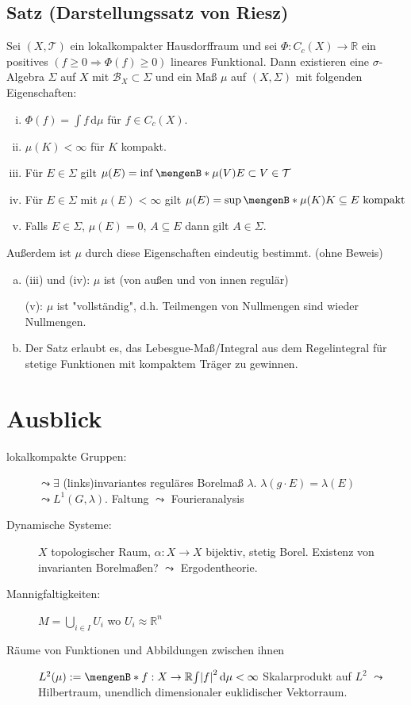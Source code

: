 \subsection{Satz (Darstellungssatz von Riesz)} %
\label{sub:925}
Sei $(X,\mathcal{T})$ ein lokalkompakter Hausdorffraum und sei $\Phi : C_c(X) \to \mathds{R}$ ein positives $(f \ge 0 \Rightarrow \Phi(f)\ge 0)$ lineares Funktional.
Dann existieren eine $\sigma$-Algebra $\Sigma$ auf $X$ mit $\mathcal{B}_X \subset \Sigma$ und ein Maß $\mu$ auf $(X, \Sigma)$ mit folgenden Eigenschaften:
\begin{enumerate}[(i)]
	\item $\Phi(f) = \int\! f  \, \mathrm{d}\mu$ für $f \in C_c(X)$.
	\item $\mu(K)< \infty$ für $K$ kompakt. 
	\item Für $E \in \Sigma$ gilt $\mu(E)= \inf\set[\mu(V)]{E \subset V \in \mathcal{T} } $
	\item Für $E \in \Sigma$ mit $\mu(E)< \infty$ gilt $\mu(E) = \sup \set[\mu(K)]{K \subseteq E \text{ kompakt}} $
	\item Falls $E \in \Sigma$, $\mu(E)=0$, $A \subseteq E$ dann gilt $A \in \Sigma$.
\end{enumerate} 
Außerdem ist $\mu$ durch diese Eigenschaften eindeutig bestimmt. \bewende(ohne Beweis)
\begin{enumerate}[a)]
	\item (iii) und (iv): $\mu$ ist  (von außen und von innen regulär) 
	
	(v): $\mu$ ist "{}vollständig"{}, d.h. Teilmengen von Nullmengen sind wieder Nullmengen.
	\item Der Satz erlaubt es, das Lebesgue-Maß/Integral aus dem Regelintegral für stetige Funktionen mit kompaktem Träger zu gewinnen.
\end{enumerate}
\newpage

\section{Ausblick} %
\label{sec:10}
\begin{description}
	\item[lokalkompakte Gruppen:] $\leadsto \exists$ (links)invariantes reguläres Borelmaß $\lambda$. $\lambda (g \cdot E) = \lambda (E)$ $\leadsto L^1(G,\lambda) $.
	Faltung $ \leadsto$ Fourieranalysis
	\item[Dynamische Systeme:] $X$ topologischer Raum, $\alpha : X \to X$ bijektiv, stetig Borel. Existenz von invarianten Borelmaßen? $\leadsto$ Ergodentheorie.
	\item[Mannigfaltigkeiten:] $M = \bigcup_{i \in I} U_i$ wo $U_i \approx \mathds{R}^n$
	\item[Räume von Funktionen und Abbildungen zwischen ihnen] $L^2(\mu) := \set[f :X \to \mathds{R}]{\int \abs*{f}^2  \, \mathrm{d}\mu < \infty } $
	Skalarprodukt auf $L^2$ $\leadsto $ Hilbertraum, unendlich dimensionaler euklidischer Vektorraum.
\end{description}





\cleardoubleoddemptypage
{}
\setcounter{page}{1}
\printindex
\listoffigures


